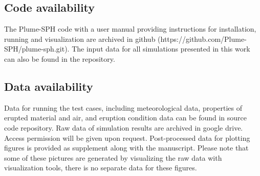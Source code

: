 \documentclass[journal abbreviation, manuscript]{copernicus}
\begin{document}
\subsection{Code availability}
The Plume-SPH code with a user manual providing instructions for installation, running and visualization are archived in github (https://github.com/Plume-SPH/plume-sph.git). The input data for all simulations presented in this work can also be found in the repository.

\subsection{Data availability}
Data for running the test cases, including meteorological data, properties of erupted material and air, and eruption condition data can be found in source code repository. Raw data of simulation results are archived in google drive. Access permission will be given upon request. Post-processed data for plotting figures is provided as supplement along with the manuscript. Please note that some of these pictures are generated by visualizing the raw data with visualization tools, there is no separate data for these figures.
%
%
%

\end{document}
